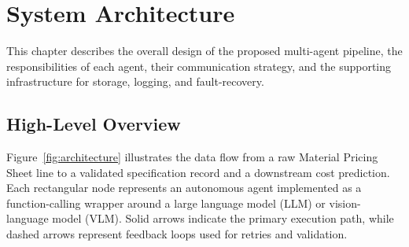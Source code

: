\chapter{System Architecture}
\label{chapter:architecture}

This chapter describes the overall design of the proposed multi-agent pipeline, the responsibilities of each agent, their communication strategy, and the supporting infrastructure for storage, logging, and fault-recovery.

\section{High-Level Overview}

Figure~\ref{fig:architecture} illustrates the data flow from a raw Material Pricing Sheet line to a validated specification record and a downstream cost prediction.  
Each rectangular node represents an autonomous agent implemented as a function-calling wrapper around a large language model (LLM) or vision-language model (VLM).  
Solid arrows indicate the primary execution path, while dashed arrows represent feedback loops used for retries and validation.


